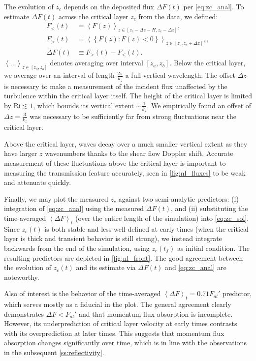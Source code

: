 \documentclass[
        fleqn,
        usenatbib,
    ]{mnras}
\newcommand*{\ev}[1]{\left\langle#1\right\rangle}
\newcommand*{\z}[1]{\left\{#1\right\}}
\begin{document}
The evolution of $z_c$ depends on the deposited flux $\Delta F(t)$ per
\autoref{eq:zc_anal}. To estimate $\Delta F(t)$ across the critical layer $z_c$
from the data, we defined:
\begin{align}
    F_{<}(t) &= \ev{F(z)}_{z \in [z_c - \Delta z - H, z_c - \Delta z]}
        ,\label{eq:sbelow_def}\\
    F_>(t) &= \ev{\z{F(z): F(z) < 0}}_{z \in [z_c, z_c + \Delta z]},
        \label{eq:sabove_def},\\
    \Delta F(t) &\equiv F_>(t) - F_{<}(t).\label{eq:ds_def}
\end{align}
$\ev{\dots}_{z \in [z_a, z_b]}$ denotes averaging over interval $[z_a, z_b]$.
Below the critical layer, we average over an interval of length
$\frac{2\pi}{k_{z}}$ a full vertical wavelength. The offset $\Delta z$ is
necessary to make a measurement of the incident flux unaffected by the
turbulence within the critical layer itself. The height of the critical layer is
limited by $\mathrm{Ri} \lesssim 1$, which bounds its vertical extent $\sim
\frac{1}{k_{z}}$. We empirically found an offset of $\Delta z = \frac{3}{k_z}$
was necessary to be sufficiently far from strong fluctuations near the critical
layer.

Above the critical layer, waves decay over a much smaller vertical extent as
they have larger $z$ wavenumbers thanks to the shear flow Doppler shift.
Accurate measurement of these fluctuations above the critical layer is important
to measuring the transmission feature accurately, seen in
\autoref{fig:nl_fluxes} to be weak and attenuate quickly.

Finally, we may plot the measured $z_c$ against two semi-analytic predictors:
(i) integration of \autoref{eq:zc_anal} using the measured $\Delta F(t)$, and
(ii) substituting the time-averaged $\ev{\Delta F}_t$ (over the entire length of
the simulation) into \autoref{eq:zc_sol}. Since $z_c(t)$ is both stable and less
well-defined at early times (when the critical layer is thick and transient
behavior is still strong), we instead integrate backwards from the end of the
simulation, using $z_c(t_f)$ as initial condition. The resulting predictors are
depicted in \autoref{fig:nl_front}. The good agreement between the evolution of
$z_c(t)$ and its estimate via $\Delta F(t)$ and \autoref{eq:zc_anal} are
noteworthy.

Also of interest is the behavior of the time-averaged $\ev{\Delta F}_t =
0.71F_{al}'$ predictor, which serves mostly as a fiducial in the plot. The
general agreement clearly demonstrates $\Delta F < F_{al}'$ and that momentum
flux absorption is incomplete. However, its underprediction of critical layer
velocity at early times contrasts with its overprediction at later times. This
suggests that momentum flux absorption changes significantly over time, which is
in line with the observations in the subsequent \autoref{ss:reflectivity}.
\end{document}

